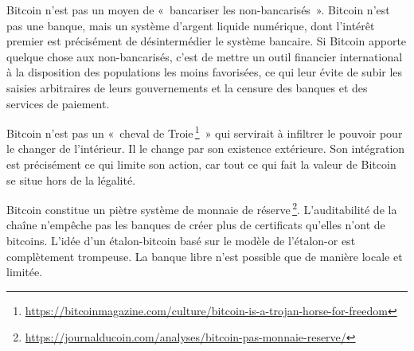 \documentclass[a4paper,notitlepage]{article}
\newcommand{\sfootnote}{\,\footnote}
\begin{document}
Bitcoin n'est pas un moyen de «~bancariser les non-bancarisés~». Bitcoin n'est pas une banque, mais un système d'argent liquide numérique, dont l'intérêt premier est précisément de désintermédier le système bancaire. Si Bitcoin apporte quelque chose aux non-bancarisés, c'est de mettre un outil financier international à la disposition des populations les moins favorisées, ce qui leur évite de subir les saisies arbitraires de leurs gouvernements et la censure des banques et des services de paiement.

Bitcoin n'est pas un «~cheval de Troie\sfootnote{\url{https://bitcoinmagazine.com/culture/bitcoin-is-a-trojan-horse-for-freedom}}~» qui servirait à infiltrer le pouvoir pour le changer de l'intérieur. Il le change par son existence extérieure. Son intégration est précisément ce qui limite son action, car tout ce qui fait la valeur de Bitcoin se situe hors de la légalité.

Bitcoin constitue un piètre système de monnaie de réserve\sfootnote{\url{https://journalducoin.com/analyses/bitcoin-pas-monnaie-reserve/}}. L'auditabilité de la chaîne n'empêche pas les banques de créer plus de certificats qu'elles n'ont de bitcoins. L'idée d'un étalon-bitcoin basé sur le modèle de l'étalon-or est complètement trompeuse. La banque libre n'est possible que de manière locale et limitée.
\end{document}
